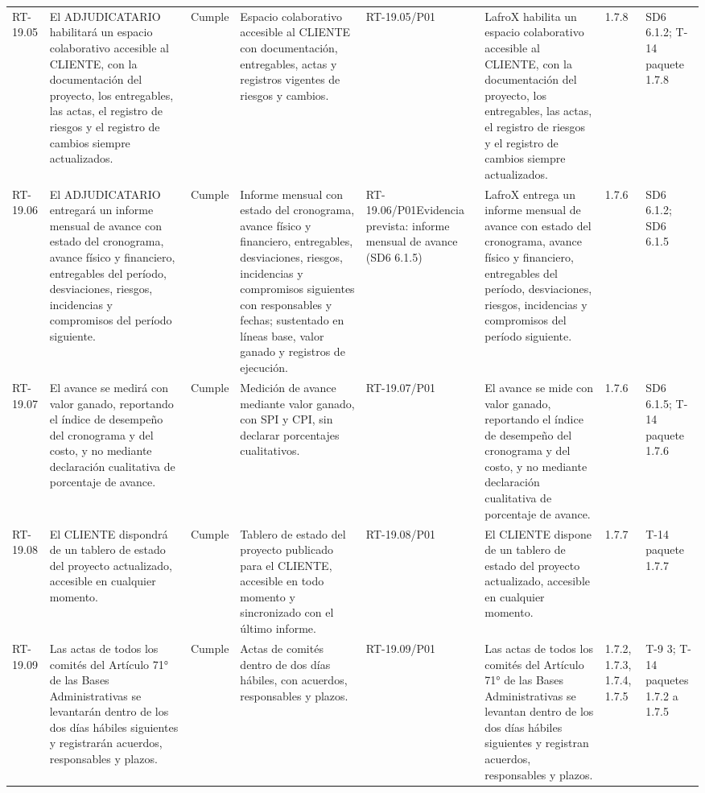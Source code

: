 \documentclass[oficio,firma,final]{lafrox}
\begin{document}
\begin{landscape}
{\begin{longtable}{@{}F{0.054} F{0.173} F{0.061} F{0.191} F{0.106} F{0.180} F{0.067} F{0.168}@{}}
  RT-19.05 & El ADJUDICATARIO habilitará un espacio colaborativo accesible al CLIENTE, con la documentación del proyecto, los entregables, las actas, el registro de riesgos y el registro de cambios siempre actualizados. & Cumple & Espacio colaborativo accesible al CLIENTE con documentación, entregables, actas y registros vigentes de riesgos y cambios. & RT-19.05/\allowbreak{}P01 & LafroX habilita un espacio colaborativo accesible al CLIENTE, con la documentación del proyecto, los entregables, las actas, el registro de riesgos y el registro de cambios siempre actualizados. & 1.7.8 & SD6 6.1.2; T-14 paquete 1.7.8  \\
  RT-19.06 & El ADJUDICATARIO entregará un informe mensual de avance con estado del cronograma, avance físico y financiero, entregables del período, desviaciones, riesgos, incidencias y compromisos del período siguiente. & Cumple & Informe mensual con estado del cronograma, avance físico y financiero, entregables, desviaciones, riesgos, incidencias y compromisos siguientes con responsables y fechas; sustentado en líneas base, valor ganado y registros de ejecución. & RT-19.06/\allowbreak{}P01\newline Evidencia prevista: informe mensual de avance (SD6 6.1.5) & LafroX entrega un informe mensual de avance con estado del cronograma, avance físico y financiero, entregables del período, desviaciones, riesgos, incidencias y compromisos del período siguiente. & 1.7.6 & SD6 6.1.2; SD6 6.1.5  \\
  RT-19.07 & El avance se medirá con valor ganado, reportando el índice de desempeño del cronograma y del costo, y no mediante declaración cualitativa de porcentaje de avance. & Cumple & Medición de avance mediante valor ganado, con SPI y CPI, sin declarar porcentajes cualitativos. & RT-19.07/\allowbreak{}P01 & El avance se mide con valor ganado, reportando el índice de desempeño del cronograma y del costo, y no mediante declaración cualitativa de porcentaje de avance. & 1.7.6 & SD6 6.1.5; T-14 paquete 1.7.6  \\
  RT-19.08 & El CLIENTE dispondrá de un tablero de estado del proyecto actualizado, accesible en cualquier momento. & Cumple & Tablero de estado del proyecto publicado para el CLIENTE, accesible en todo momento y sincronizado con el último informe. & RT-19.08/\allowbreak{}P01 & El CLIENTE dispone de un tablero de estado del proyecto actualizado, accesible en cualquier momento. & 1.7.7 & T-14 paquete 1.7.7  \\
  RT-19.09 & Las actas de todos los comités del Artículo 71° de las Bases Administrativas se levantarán dentro de los dos días hábiles siguientes y registrarán acuerdos, responsables y plazos. & Cumple & Actas de comités dentro de dos días hábiles, con acuerdos, responsables y plazos. & RT-19.09/\allowbreak{}P01 & Las actas de todos los comités del Artículo 71° de las Bases Administrativas se levantan dentro de los dos días hábiles siguientes y registran acuerdos, responsables y plazos. & 1.7.2, 1.7.3, 1.7.4, 1.7.5 & T-9 3; T-14 paquetes 1.7.2 a 1.7.5  \\

\end{longtable}}
\end{landscape}
\end{document}
